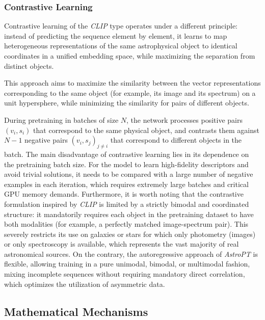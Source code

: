 \subsubsection{Contrastive Learning}

Contrastive learning of the \textit{\gls{CLIP}} type \autocite{ar:clip} operates under a different principle: instead of predicting the sequence element by element, it learns to map heterogeneous representations of the same astrophysical object to identical coordinates in a unified embedding space, while maximizing the separation from distinct objects.

This approach aims to maximize the similarity between the vector representations corresponding to the same object (for example, its image and its spectrum) on a unit hypersphere, while minimizing the similarity for pairs of different objects.

During pretraining in batches of size $N$, the network processes positive pairs $\left(v_i, s_i\right)$ that correspond to the same physical object, and contrasts them against $N-1$ negative pairs $\left(v_i, s_j\right)_{j\neq i}$ that correspond to different objects in the batch. The main disadvantage of contrastive learning lies in its dependence on the pretraining batch size. For the model to learn high-fidelity descriptors and avoid trivial solutions, it needs to be compared with a large number of negative examples in each iteration, which requires extremely large batches and critical GPU memory demands. Furthermore, it is worth noting that the contrastive formulation inspired by \textit{\gls{CLIP}} \autocites{ar:clip}{ar:astroclip} is limited by a strictly bimodal and coordinated structure: it mandatorily requires each object in the pretraining dataset to have both modalities (for example, a perfectly matched image-spectrum pair). This severely restricts its use on galaxies or stars for which only photometry (images) or only spectroscopy is available, which represents the vast majority of real astronomical sources. On the contrary, the autoregressive approach of \textit{AstroPT} \autocite{ar:astropt} is flexible, allowing training in a pure unimodal, bimodal, or multimodal fashion, mixing incomplete sequences without requiring mandatory direct correlation, which optimizes the utilization of asymmetric data.

\subsection{Mathematical Mechanisms} \label{sec:tb:math}

